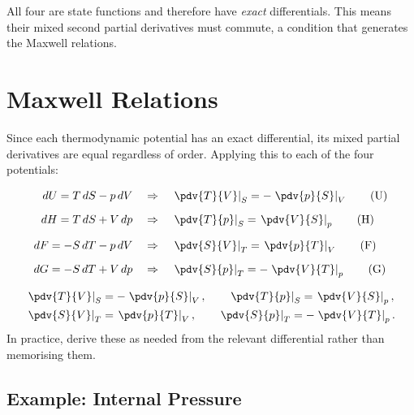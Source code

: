 All four are state functions and therefore have \emph{exact} differentials. This means their mixed second partial derivatives must commute, a condition that generates the Maxwell relations.

\section{Maxwell Relations}

Since each thermodynamic potential has an exact differential, its mixed partial derivatives are equal regardless of order. Applying this to each of the four potentials:

\begin{align}
    dU = T\,dS - p\,dV \quad&\Rightarrow\quad \left.\pdv{T}{V}\right|_S = -\left.\pdv{p}{S}\right|_V \tag{U} \\[6pt]
    dH = T\,dS + V\,dp \quad&\Rightarrow\quad \left.\pdv{T}{p}\right|_S = \left.\pdv{V}{S}\right|_p \tag{H} \\[6pt]
    dF = -S\,dT - p\,dV \quad&\Rightarrow\quad \left.\pdv{S}{V}\right|_T = \left.\pdv{p}{T}\right|_V \tag{F} \\[6pt]
    dG = -S\,dT + V\,dp \quad&\Rightarrow\quad \left.\pdv{S}{p}\right|_T = -\left.\pdv{V}{T}\right|_p \tag{G}
\end{align}

\begin{theorem}
\begin{align}
    \left.\pdv{T}{V}\right|_S &= -\left.\pdv{p}{S}\right|_V, \qquad
    \left.\pdv{T}{p}\right|_S = \left.\pdv{V}{S}\right|_p, \notag \\
    \left.\pdv{S}{V}\right|_T &= \left.\pdv{p}{T}\right|_V, \qquad
    \left.\pdv{S}{p}\right|_T = -\left.\pdv{V}{T}\right|_p.
\end{align}
In practice, derive these as needed from the relevant differential rather than memorising them.
\end{theorem}

\subsection{Example: Internal Pressure}

